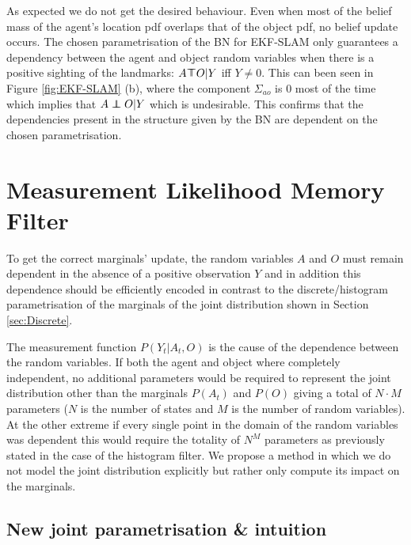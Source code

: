 \documentclass[review]{elsarticle}
\numberwithin{equation}{section}
\begin{document}
As expected we do not get the desired behaviour. Even when most of the belief mass of the agent's 
location pdf overlaps that of the object pdf, no belief update occurs. The chosen parametrisation of the BN for EKF-SLAM only guarantees a 
dependency between the agent and object random variables when there is a positive sighting of the landmarks:
$A \dependent O | Y$ iff $Y \not= 0$.  This can been seen in Figure \ref{fig:EKF-SLAM} (b), where the component 
$\Sigma_{ao}$ is 0 most of the time which implies that $A \independent O | Y$ which is undesirable. 
This confirms that the dependencies present in the structure given by the BN are dependent on the chosen parametrisation.


\FloatBarrier
\section{Measurement Likelihood Memory Filter}

To get the correct marginals' update, the random variables $A$ and $O$ must remain 
dependent in the absence of a positive observation $Y$ and in addition this dependence should be efficiently encoded in contrast to the
discrete/histogram parametrisation of the marginals of the joint distribution shown in Section \ref{sec:Discrete}. 

The measurement function $P(Y_t|A_t,O)$ is the cause of the dependence between the random variables. If both the agent and object 
where completely independent, no additional parameters would be required to represent the joint distribution other than the marginals 
$P(A_t)$ and $P(O)$ giving a total of $N \cdot M$ parameters ($N$ is the number of states and $M$ is the number of random variables). 
At the other extreme if every single point in the domain of the random variables was dependent this would require the totality 
of $N^M$ parameters as previously stated in the case of the histogram filter. We propose a method in which we do not model the joint
distribution explicitly but rather only compute its impact on the marginals. 

\subsection{New joint parametrisation \& intuition}
\end{document}
